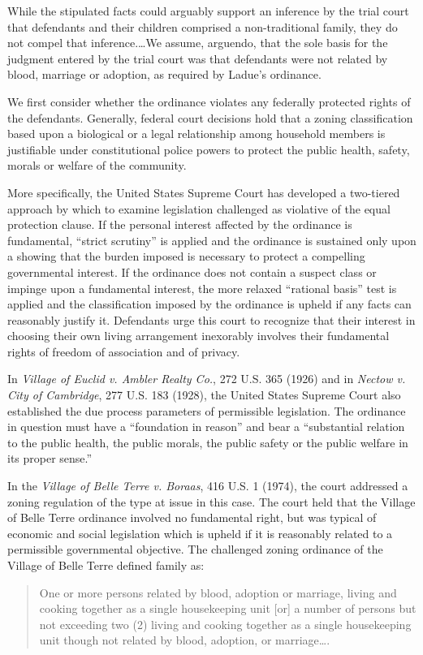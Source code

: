 While the stipulated facts could arguably support an inference by the trial
court that defendants and their children comprised a non-traditional family,
they do not compel that inference.\ldots We assume, arguendo, that the sole
basis for the judgment entered by the trial court was that defendants were not
related by blood, marriage or adoption, as required by Ladue's ordinance.

We first consider whether the ordinance violates any federally protected rights
of the defendants. Generally, federal court decisions hold that a zoning
classification based upon a biological or a legal relationship among household
members is justifiable under constitutional police powers to protect the public
health, safety, morals or welfare of the community. 

More specifically, the United States Supreme Court has developed a two-tiered
approach by which to examine legislation challenged as violative of the equal
protection clause. If the personal interest affected by the ordinance is
fundamental, ``strict scrutiny'' is applied and the ordinance is sustained only
upon a showing that the burden imposed is necessary to protect a compelling
governmental interest. If the ordinance does not contain a suspect class or
impinge upon a fundamental interest, the more relaxed ``rational basis'' test is
applied and the classification imposed by the ordinance is upheld if any facts
can reasonably justify it. Defendants urge this court to recognize that their
interest in choosing their own living arrangement inexorably involves their
fundamental rights of freedom of association and of privacy.

In \textit{Village of Euclid v. Ambler Realty Co.}, 272 U.S. 365 (1926) and in
\textit{Nectow v. City of Cambridge}, 277 U.S. 183 (1928), the United States
Supreme Court also established the due process parameters of permissible
legislation. The ordinance in question must have a ``foundation in reason'' and
bear a ``substantial relation to the public health, the public morals, the
public safety or the public welfare in its proper sense.'' 

In the \textit{Village of Belle Terre v. Boraas}, 416 U.S. 1 (1974), the court
addressed a zoning regulation of the type at issue in this case. The court held
that the Village of Belle Terre ordinance involved no fundamental right, but was
typical of economic and social legislation which is upheld if it is reasonably
related to a permissible governmental objective. The challenged zoning ordinance
of the Village of Belle Terre defined family as:
\begin{quote}
One or more persons related by blood, adoption or marriage, living and cooking
together as a single housekeeping unit [or] a number of persons but not
exceeding two (2) living and cooking together as a single housekeeping unit
though not related by blood, adoption, or marriage\ldots.
\end{quote}

